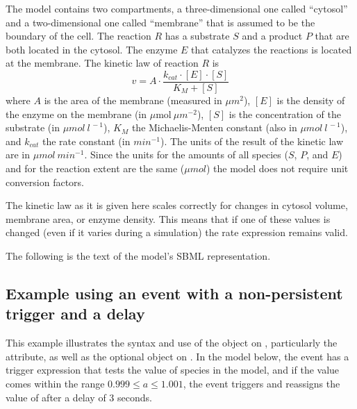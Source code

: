 The model contains two compartments, a three-dimensional one
called {}``cytosol'' and a two-dimensional one called
{}``membrane'' that is assumed to be the boundary of the cell. The
reaction $R$ has a substrate $S$ and a product $P$ that are both
located in the cytosol. The enzyme $E$ that catalyzes the
reactions is located at the membrane. The kinetic law of reaction
$R$ is\[ v=A\cdot\frac{k_{cat}\cdot[E]\cdot[S]}{K_{M}+[S]}\] where
$A$ is the area of the membrane (measured in $\mu m^{2}$), $[E]$
is the density of the enzyme on the membrane (in
$\mu\mathrm{mol}~\mu m^{-2}$), $[S]$ is the concentration of the
substrate (in $\mu mol~l^{\,-1}$), $K_{M}$ the Michaelis-Menten
constant (also in $\mu mol~l^{\,-1}$), and $k_{cat}$ the rate
constant (in $min^{-1}$). The units of the result of the kinetic
law are in $\mu mol~min^{-1}$. Since the units for the amounts of
all species ($S$, $P$, and $E$) and for the reaction extent are
the same ($\mu mol$) the model does not require unit conversion
factors.

The kinetic law as it is given here scales correctly for changes
in cytosol volume, membrane area, or enzyme density. This means
that if one of these values is changed (even if it varies during a
simulation) the rate expression remains valid.

The following is the text of the model's SBML representation.



\subsection{Example using an event with a non-persistent trigger and a delay}
\label{sec:eg:nonpersistent-trigger}

This example illustrates the syntax and use of the \Trigger object
on \Event, particularly the  attribute, as well
as the optional \Delay object on \Event.  In the model below, the
event has a trigger expression that tests the value of species
 in the model, and if the value comes within the range
$0.999 \leq a \leq 1.001$, the event triggers and reassigns the
value of  after a delay of 3 seconds.

